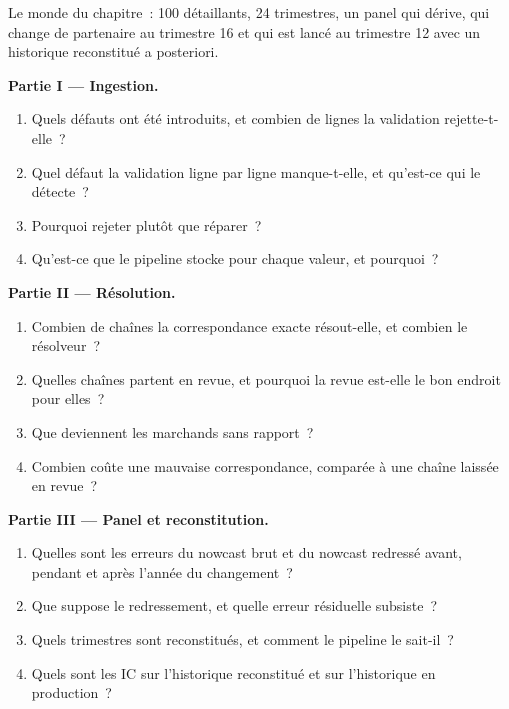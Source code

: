 \begin{problem}\label{pb:ml:alternative-data-pipelines:1}
Le monde du chapitre~: 100 détaillants, 24 trimestres, un panel qui dérive, qui change de partenaire au trimestre 16 et qui
est lancé au trimestre 12 avec un historique reconstitué a posteriori.

\medskip\noindent\textbf{Partie I --- Ingestion.}
\begin{enumerate}
\item Quels défauts ont été introduits, et combien de lignes la validation rejette-t-elle~?
\item Quel défaut la validation ligne par ligne manque-t-elle, et qu'est-ce qui le détecte~?
\item Pourquoi rejeter plutôt que réparer~?
\item Qu'est-ce que le pipeline stocke pour chaque valeur, et pourquoi~?
\end{enumerate}

\medskip\noindent\textbf{Partie II --- Résolution.}
\begin{enumerate}[resume]
\item Combien de chaînes la correspondance exacte résout-elle, et combien le résolveur~?
\item Quelles chaînes partent en revue, et pourquoi la revue est-elle le bon endroit pour elles~?
\item Que deviennent les marchands sans rapport~?
\item Combien coûte une mauvaise correspondance, comparée à une chaîne laissée en revue~?
\end{enumerate}

\medskip\noindent\textbf{Partie III --- Panel et reconstitution.}
\begin{enumerate}[resume]
\item Quelles sont les erreurs du nowcast brut et du nowcast redressé avant, pendant et après l'année du changement~?
\item Que suppose le redressement, et quelle erreur résiduelle subsiste~?
\item Quels trimestres sont reconstitués, et comment le pipeline le sait-il~?
\item Quels sont les IC sur l'historique reconstitué et sur l'historique en production~?
\end{enumerate}


\end{problem}
